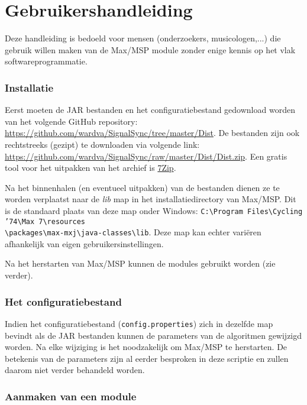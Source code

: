 \chapter{Gebruikershandleiding}
\label{appendix-d}

Deze handleiding is bedoeld voor mensen (onderzoekers, musicologen,...) die gebruik willen maken van de Max/MSP module zonder enige kennis op het vlak softwareprogrammatie.

\subsection*{Installatie}

Eerst moeten de JAR bestanden en het configuratiebestand gedownload worden van het volgende GitHub repository: \url{https://github.com/wardva/SignalSync/tree/master/Dist}. De bestanden zijn ook rechtstreeks (gezipt) te downloaden via volgende link: \url{https://github.com/wardva/SignalSync/raw/master/Dist/Dist.zip}. Een gratis tool voor het uitpakken van het archief is \href{http://www.7-zip.org/}{7Zip}.

Na het binnenhalen (en eventueel uitpakken) van de bestanden dienen ze te worden verplaatst naar de \emph{lib} map in het installatiedirectory van Max/MSP. Dit is de standaard plaats van deze map onder Windows: \texttt{C:\textbackslash Program Files\textbackslash Cycling '74\textbackslash Max 7\textbackslash resources\\\textbackslash packages\textbackslash max-mxj\textbackslash java-classes\textbackslash lib}. Deze map kan echter variëren afhankelijk van eigen gebruikersinstellingen.

Na het herstarten van Max/MSP kunnen de modules gebruikt worden (zie verder).

\subsection*{Het configuratiebestand}

Indien het configuratiebestand (\texttt{config.properties}) zich in dezelfde map bevindt als de JAR bestanden kunnen de parameters van de algoritmen gewijzigd worden. Na elke wijziging is het noodzakelijk om Max/MSP te herstarten. De betekenis van de parameters zijn al eerder besproken in deze scriptie en zullen daarom niet verder behandeld worden.

\subsection*{Aanmaken van een module}

